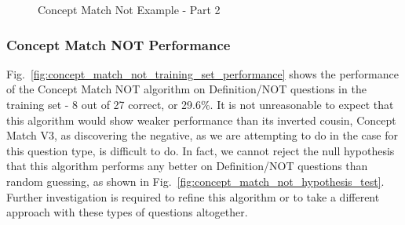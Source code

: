 \begin{figure}
\centering
\vspace{0.75in}
\caption{Concept Match Not Example - Part 2}
\label{fig:concept_match_not_example_part_2}
\end{figure}

\subsubsection{Concept Match NOT Performance}

Fig.~\ref{fig:concept_match_not_training_set_performance} shows the performance of the Concept Match NOT algorithm on Definition/NOT questions in the training set - 8 out of 27 correct, or 29.6\%.  It is not unreasonable to expect that this algorithm would show weaker performance than its inverted cousin, Concept Match V3, as discovering the negative, as we are attempting to do in the case for this question type, is difficult to do.  In fact, we cannot reject the null hypothesis that this algorithm performs any better on Definition/NOT questions than random guessing, as shown in Fig.~\ref{fig:concept_match_not_hypothesis_test}.  Further investigation is required to refine this algorithm or to take a different approach with these types of questions altogether.



